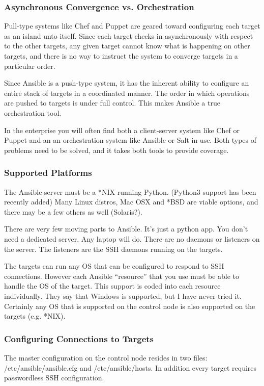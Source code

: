\documentclass[helvetica,english,utf8,notitle,nologo]{beamer}
\begin{document}
\begin{frame}
  \frametitle{Asynchronous Convergence vs. Orchestration}

  Pull-type systems like Chef and Puppet are geared toward configuring
  each target as an island unto itself. Since each target checks in
  asynchronously with respect to the other targets, any given target
  cannot know what is happening on other targets, and there is no way
  to instruct the system to converge targets in a particular order.

  Since Ansible is a push-type system, it has the inherent ability to
  configure an entire stack of targets in a coordinated manner. The
  order in which operations are pushed to targets is under full
  control. This makes Ansible a true orchestration tool.

  In the enterprise you will often find both a client-server system
  like Chef or Puppet and an an orchestration system like Ansible or
  Salt in use. Both types of problems need to be solved, and it takes
  both tools to provide coverage.
\end{frame}

\begin{frame}
  \frametitle{Supported Platforms}

  The Ansible server must be a *NIX running Python. (Python3 support
  has been recently added) Many Linux distros, Mac OSX and *BSD are
  viable options, and there may be a few others as well (Solaris?).

  There are very few moving parts to Ansible. It's just a python
  app. You don't need a dedicated server. Any laptop will do. There
  are no daemons or listeners on the server. The listeners are the SSH
  daemons running on the targets.

  The targets can run any OS that can be configured to respond to SSH
  connections. However each Ansible ``resource'' that you use must be
  able to handle the OS of the target. This support is coded into each
  resource individually. They say that Windows is supported, but I
  have never tried it. Certainly any OS that is supported on the
  control node is also supported on the targets (e.g. *NIX).
\end{frame}

\begin{frame}
  \frametitle{Configuring Connections to Targets}

  The master configuration on the control node resides in two files:
  /etc/ansible/ansible.cfg and /etc/ansible/hosts. In addition every
  target requires passwordless SSH configuration.
\end{frame}
\end{document}
